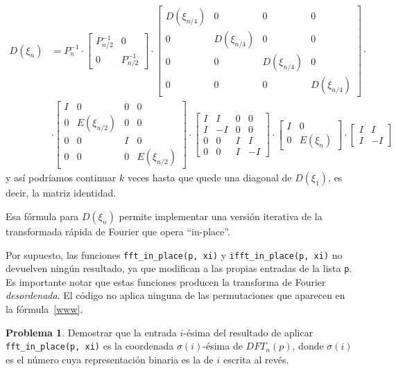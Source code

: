 \documentclass[a4paper, 11pt]{article}
\newcounter{numerodetema}
\theoremstyle{plain}
\theoremstyle{definition}
\newtheorem{prob}{Problema}[numerodetema]
\begin{document}
\begin{equation}\label{www}
\begin{aligned}
  D(\xi_n) &= P_n^{-1}\cdot
  \left[\begin{array}{cc}P_{n/2}^{-1} & 0 \\ 0 & P_{n/2}^{-1}\end{array}\right]\cdot
  \left[\begin{array}{cccc}D(\xi_{n/4}) & 0 & 0 & 0 \\ 0 & D(\xi_{n/4}) & 0 & 0 \\
  0 & 0 & D(\xi_{n/4}) & 0 \\ 0 & 0 & 0 & D(\xi_{n/4})\end{array}\right]\cdot \\
  &\cdot
  \left[\begin{array}{cccc}I & 0 & 0 & 0 \\ 0 & E(\xi_{n/2}) & 0 & 0 \\
  0 & 0 & I & 0 \\ 0 & 0 & 0 & E(\xi_{n/2})\end{array}\right]\cdot
  \left[\begin{array}{cccc}I & I & 0 & 0 \\ I & -I & 0 & 0 \\
  0 & 0 & I & I \\ 0 & 0 & I & -I\end{array}\right]\cdot
  \left[\begin{array}{cc}I & 0 \\ 0 & E(\xi_n)\end{array}\right]\cdot
  \left[\begin{array}{cc}I & I \\ I & -I\end{array}\right]
\end{aligned}
\end{equation}
y así podríamos continuar $k$ veces hasta que quede una diagonal de $D(\xi_1)$,
es decir, la matriz identidad.

\bigskip

Esa fórmula para $D(\xi_n)$ permite implementar una versión iterativa
de la transformada rápida de Fourier que opera ``in-place''.

\bigskip



\bigskip

Por supuesto, las funciones \texttt{fft\_in\_place(p, xi)} y
\texttt{ifft\_in\_place(p, xi)} no  devuelven ningún resultado, ya que
modifican a las propias entradas de la lista \texttt{p}. Es importante
notar que estas funciones producen la transforma de Fourier \emph{desordenada}.
El código no aplica ninguna de las permutaciones que aparecen en la
fórmula~\eqref{www}.

\begin{prob}
Demostrar que la entrada $i$-ésima del resultado de aplicar 
\texttt{fft\_in\_place(p, xi)} es la coordenada $\sigma(i)$-ésima de $DFT_n(p)$,
donde $\sigma(i)$ es el número cuya representación binaria es la de $i$
escrita al revés.
\end{prob}

\end{document}
